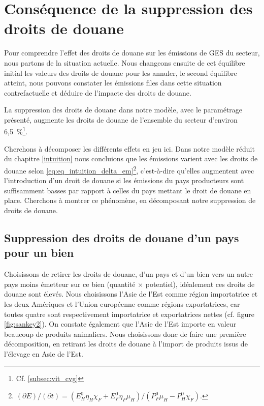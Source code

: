 \section{Conséquence de la suppression des droits de douane}

Pour comprendre l'effet des droits de douane sur les émissions de GES du secteur, nous partons de la situation actuelle. Nous changeons ensuite de cet équilibre initial les valeurs des droits de douane pour les annuler, le second équilibre atteint, nous pouvons constater les émissions files dans cette situation contrefactuelle et déduire de l'impacte des droits de douane.

La suppression des droits de douane dans notre modèle, avec le paramétrage présenté, augmente les droits de douane de l'ensemble du secteur d'environ 6,5~\%\footnote{Cf. \ref{subsec:vit_cvg}}.

Cherchons à décomposer les différents effets en jeu ici. Dans notre modèle réduit du chapitre \ref{intuition} nous concluions que les émissions varient avec les droits de douane selon \ref{eq:eq_intuition_delta_em}\footnote{$\left({\partial E}\right)/\left( {\partial t} \right) = \left( {E_H^0 \eta_H \chi_F + E_F^0 \eta_F \mu_H} \right)/\left( {P_F^0 \mu_H - P_H^0 \chi_F} \right).$}, c'est-à-dire qu'elles augmentent avec l'introduction d'un droit de douane si les émissions du pays producteurs sont suffisamment basses par rapport à celles du pays mettant le droit de douane en place. Cherchons à montrer ce phénomène, en décomposant notre suppression de droits de douane.

\subsection{Suppression des droits de douane d'un pays pour un bien}\label{subsec:ae_anp}

Choisissons de retirer les droits de douane, d'un pays et d'un bien vers un autre pays moins émetteur sur ce bien (quantité $\times$ potentiel), idéalement ces droits de douane sont élevés. Nous choisissons l'Asie de l'Est comme région importatrice et les deux Amériques et l'Union européenne comme régions exportatrices, car toutes quatre sont respectivement importatrice et exportatrices nettes (cf. figure \ref{fig:sankey2}). On constate également que l'Asie de l'Est importe en valeur beaucoup de produits animaliers. Nous choisissons donc de faire une première décomposition, en retirant les droits de douane à l'import de produits issus de l'élevage en Asie de l'Est.

